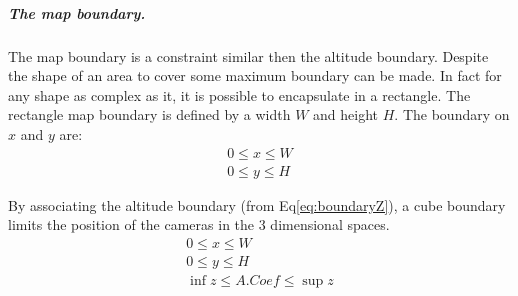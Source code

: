  \subparagraph{The map boundary.}
The map boundary is a constraint similar then the altitude boundary. Despite the shape of an area to cover some maximum boundary can be made. In fact for any shape as complex as it, it is  possible to encapsulate in a rectangle. The rectangle map boundary is defined by a width $W$ and height $H$. The boundary on $x$ and $y$ are:
 \begin{equation}
  \begin{array}{lcl}
  	0\leq x\leq W \\
  	 0\leq y\leq H 
  \end{array} 
 \end{equation}  
 
By associating the altitude boundary (from Eq\ref{eq:boundaryZ}), a cube boundary limits the position of the cameras in the 3 dimensional spaces. 
\begin{equation}\label{eq:3dBoundary}
  \begin{array}{lclcl}
  	0\leq x\leq W \\ 0\leq y\leq H  \\ \inf z\leq A.Coef\leq \sup z  
  \end{array} 
 \end{equation} 
 

